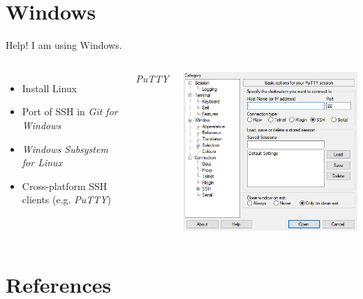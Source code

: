 \documentclass[10pt, graphics, aspectratio=169, table]{beamer}
\begin{document}
\section{Windows}
\begin{frame}[fragile]{Help! I am using Windows.}
	\begin{columns}
		\begin{itemize}
			\item Install Linux
			\item Port of SSH in \emph{Git for Windows}
			\item \emph{Windows Subsystem for Linux}
			\item Cross-platform SSH clients (e.g. \emph{PuTTY})
		\end{itemize}
		\centering
		\emph{PuTTY} \cite{putty}

		\includegraphics[height=0.65\paperheight]{img/putty.png}
	\end{columns}
\end{frame}

\maketitle

\section{References}
\begin{frame}[allowframebreaks]
	\printbibliography[heading=none]
\end{frame}
\end{document}
